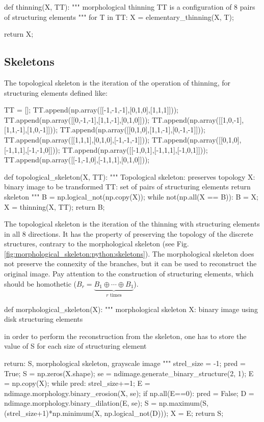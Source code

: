 \begin{python}
def thinning(X, TT):
    """
    morphological thinning
    TT is a configuration of 8 pairs of structuring elements
    """
    for T in TT:
        X = elementary_thinning(X, T);

    return X;
\end{python}

\subsection{Skeletons}
The topological skeleton is the iteration of the operation of thinning, for structuring elements defined like:
\begin{python}
TT = [];
TT.append(np.array([[-1,-1,-1],[0,1,0],[1,1,1]]));
TT.append(np.array([[0,-1,-1],[1,1,-1],[0,1,0]]));
TT.append(np.array([[1,0,-1],[1,1,-1],[1,0,-1]]));
TT.append(np.array([[0,1,0],[1,1,-1],[0,-1,-1]]));
TT.append(np.array([[1,1,1],[0,1,0],[-1,-1,-1]]));
TT.append(np.array([[0,1,0],[-1,1,1],[-1,-1,0]]));
TT.append(np.array([[-1,0,1],[-1,1,1],[-1,0,1]]));
TT.append(np.array([[-1,-1,0],[-1,1,1],[0,1,0]]));
\end{python}

\begin{python}
def topological_skeleton(X, TT):
    """
    Topological skeleton: preserves topology
    X: binary image to be transformed
    TT: set of pairs of structuring elements
    return skeleton
    """
    B = np.logical_not(np.copy(X));
    while not(np.all(X == B)):
        B = X;
        X = thinning(X, TT);
    return B;
\end{python}


The topological skeleton is the iteration of the thinning with structuring elements in all 8 directions. It has the property of preserving the topology of the discrete structures, contrary to the morphological skeleton (see Fig.\ref{fig:morphological_skeleton:python:skeletons}).
The morphological skeleton does not preserve the connexity of the branches, but it can be used to reconstruct the original image. Pay attention to the construction of structuring elements, which should be homothetic ($B_r=\underbrace {B_1\oplus \cdots \oplus B_1}_{{r{\mbox{ times}}}}$).
\begin{python}
def morphological_skeleton(X):
    """ 
    morphological skeleton 
    X: binary image
    using disk structuring elements
    
    in order to perform the reconstruction from the skeleton, one has to store 
    the value of S for each size of structuring element
    
    return: S, morphological skeleton, grayscale image
    """
    strel_size = -1;
    pred = True;
    S = np.zeros(X.shape);
    se = ndimage.generate_binary_structure(2, 1);
    E = np.copy(X);
    while pred:
        strel_size+=1;
        E = ndimage.morphology.binary_erosion(X, se);
        if np.all(E==0):
            pred = False;
        D = ndimage.morphology.binary_dilation(E, se);
        S = np.maximum(S, (strel_size+1)*np.minimum(X, np.logical_not(D)));
        X = E;
    return S;
\end{python}

